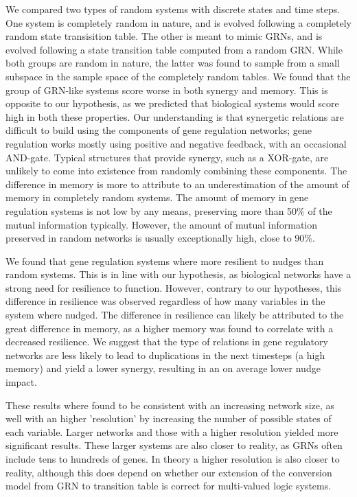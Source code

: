 \documentclass[../main.tex]{subfiles}
\begin{document}
We compared two types of random systems with discrete states and time steps.
One system is completely random in nature, and is evolved following a completely random state transisition table.
The other is meant to mimic GRNs, and is evolved following a state transition table computed from a random GRN.
While both groups are random in nature, the latter was found to sample from a small subspace in the sample space of the completely random tables.
We found that the group of GRN-like systems score worse in both synergy and memory.
This is opposite to our hypothesis, as we predicted that biological systems would score high in both these properties.
Our understanding is that synergetic relations are difficult to build using the components of gene regulation networks; gene regulation works mostly using positive and negative feedback, with an occasional AND-gate.
Typical structures that provide synergy, such as a XOR-gate, are unlikely to come into existence from randomly combining these components.
The difference in memory is more to attribute to an underestimation of the amount of memory in completely random systems.
The amount of memory in gene regulation systems is not low by any means, preserving more than 50\% of the mutual information typically.
However, the amount of mutual information preserved in random networks is usually exceptionally high, close to 90\%.

We found that gene regulation systems where more resilient to nudges than random systems.
This is in line with our hypothesis, as biological networks have a strong need for resilience to function.
However, contrary to our hypotheses, this difference in resilience was observed regardless of how many variables in the system where nudged.
The difference in resilience can likely be attributed to the great difference in memory, as a higher memory was found to correlate with a decreased resilience.
We suggest that the type of relations in gene regulatory networks are less likely to lead to duplications in the next timesteps (a high memory) and yield a lower synergy, resulting in an on average lower nudge impact.

These results where found to be consistent with an increasing network size, as well with an higher 'resolution' by increasing the number of possible states of each variable.
Larger networks and those with a higher resolution yielded more significant results.
These larger systems are also closer to reality, as GRNs often include tens to hundreds of genes.
In theory a higher resolution is also closer to reality, although this does depend on whether our extension of the conversion model from GRN to transition table is correct for multi-valued logic systems.
\end{document}
